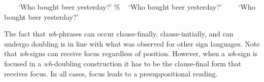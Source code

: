 \begin{exe}
\ex\label{differentpositionsdgs}
\begin{xlist} 
\ex \textcolor{white}{\%}
%
\glt \textcolor{white}{\%}`Who bought beer yesterday?' \label{ex:differentpositionsdgsa} 
\ex \%
%
\glt \textcolor{white}{\%}`Who bought beer yesterday?' \label{ex:differentpositionsdgsb} 
\ex \textcolor{white}{\%}
%
\glt \textcolor{white}{\%}`Who bought beer yesterday?' \label{ex:differentpositionsdgsaaaa}
\end{xlist}
\end{exe}

\noindent The fact that \textit{wh}-phrases can occur clause-finally, clause-initially, and can undergo doubling is in line with what was observed for other sign languages. Note that \textit{wh}-signs can receive focus regardless of position. However, when a \textit{wh}-sign is focused in a \textit{wh}-doubling construction it has to be the clause-final form that receives focus. In all cases, focus leads to a presuppositional reading. 

